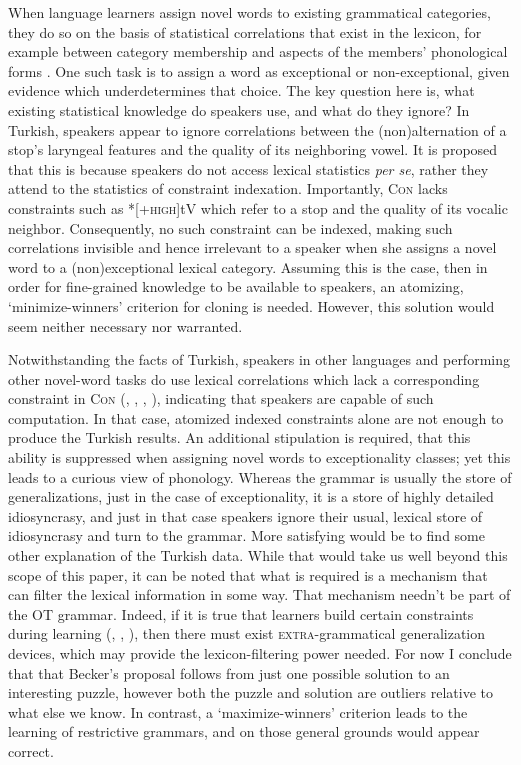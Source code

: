 \documentclass[output=paper,
modfonts
]{LSP/langsci}
\begin{document}
When language learners assign novel words to existing grammatical categories, they do so on the basis of statistical correlations that exist in the lexicon, for example between category membership and aspects of the members' phonological forms \citep{poplack1982,albright2002b}. One such task is to assign a word as exceptional or non-exceptional, given evidence which underdetermines that choice. The key question here is, what existing statistical knowledge do speakers use, and what do they ignore? In Turkish, speakers appear to ignore correlations between the (non)alternation of a stop's laryngeal features and the quality of its neighboring vowel. It is proposed \citep{becker2009,becker2011r} that this is because speakers do not access lexical statistics \textit{per se}, rather they attend to the statistics of constraint indexation. Importantly, \textsc{Con} lacks constraints such as *[+\textsc{high}]tV which refer to a stop and the quality of its vocalic neighbor. Consequently, no such constraint can be indexed, making such correlations invisible and hence irrelevant to a speaker when she assigns a novel word to a (non)exceptional lexical category. Assuming this is the case, then in order for fine-grained knowledge to be available to speakers, an atomizing, `minimize-winners' criterion for cloning is needed. However, this solution would seem neither necessary nor warranted.

Notwithstanding the facts of Turkish, speakers in other languages and performing other novel-word tasks do use lexical correlations which lack a corresponding constraint in \textsc{Con} (\citealt{moreton1999}, \citealt{albright2002b}, \citealt{albrighthayes2002}, \citealt{ernestus2003}), indicating that speakers are capable of such computation. In that case, atomized indexed constraints alone are not enough to produce the Turkish results. An additional stipulation is required, that this ability is suppressed when assigning novel words to exceptionality classes; yet this leads to a curious view of phonology. Whereas the grammar is usually the store of generalizations, just in the case of exceptionality, it is a store of highly detailed idiosyncrasy, and just in that case speakers ignore their usual, lexical store of idiosyncrasy and turn to the grammar. More satisfying would be to find some other explanation of the Turkish data. While that would take us well beyond this scope of this paper, it can be noted that what is required is a mechanism that can filter the lexical information in some way. That mechanism needn't be part of the OT grammar. Indeed, if it is true that learners build certain constraints during learning (\citealt{flack2007r}, \citealt{hayes2008}, \citealt{hayes2014}), then there must exist \textsc{extra}-grammatical generalization devices, which may provide the lexicon-filtering power needed. For now I conclude that that Becker's proposal follows from just one possible solution to an interesting puzzle, however both the puzzle and solution are outliers relative to what else we know. In contrast, a `maximize-winners' criterion leads to the learning of restrictive grammars, and on those general grounds would appear correct.
\end{document}

